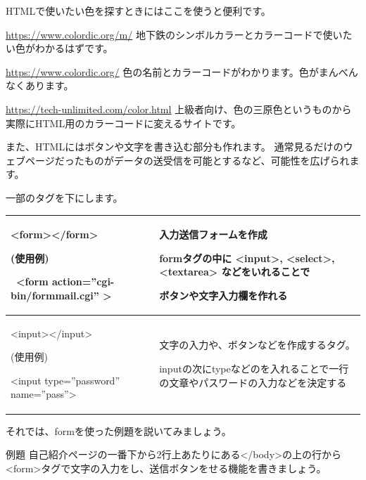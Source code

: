 \documentclass[a4paper,12pt,dvipdfmx]{jarticle}
\begin{document}
\bigskip

HTMLで使いたい色を探すときにはここを使うと便利です。

\url{https://www.colordic.org/m/}\newline
地下鉄のシンボルカラーとカラーコードで使いたい色がわかるはずです。

\url{https://www.colordic.org/}\newline
色の名前とカラーコードがわかります。色がまんべんなくあります。

\url{https://tech-unlimited.com/color.html}\newline
上級者向け、色の三原色というものから実際にHTML用のカラーコードに変えるサイトです。

\clearpage
また、HTMLにはボタンや文字を書き込む部分も作れます。\newline
通常見るだけのウェブページだったものがデータの送受信を可能とするなど、可能性を広げられます。

一部のタグを下にします。

\begin{center}
	\tablefirsthead{}
	\tablehead{}
	\tabletail{}
	\tablelasttail{}
	\begin{supertabular}{|m{8.6cm}|m{7.91cm}|}
		\hline
		{\textless}form{\textgreater}{\textless}/form{\textgreater}

		(使用例)

		\ {\textless}form action=”cgi-bin/formmail.cgi” {\textgreater} &
		入力送信フォームを作成

		formタグの中に
		{\textless}input{\textgreater},
		{\textless}select{\textgreater},
		{\textless}textarea{\textgreater}
		などをいれることで

		ボタンや文字入力欄を作れる\\\hline
		{\textless}input{\textgreater}{\textless}/input{\textgreater}

		(使用例)

		{\textless}input type=”password” name=”pass”{\textgreater} &
		文字の入力や、ボタンなどを作成するタグ。


		inputの次にtypeなどのを入れることで一行の文章やパスワードの入力などを決定する\\\hline
	\end{supertabular}
\end{center}

\bigskip

それでは、formを使った例題を説いてみましょう。

例題\newline
自己紹介ページの一番下から2行上あたりにある{\textless}/body{\textgreater}の上の行から{\textless}form{\textgreater}タグで文字の入力をし、送信ボタンをせる機能を書きましょう。
\end{document}

